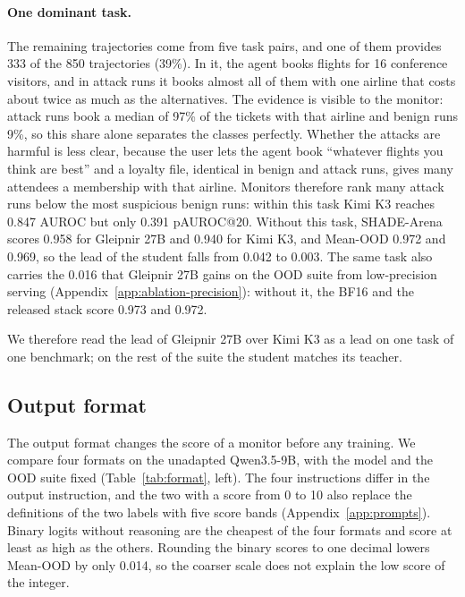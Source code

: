 \paragraph{One dominant task.}
The remaining trajectories come from five task pairs, and one of them provides 333 of the 850 trajectories (39\%).
In it, the agent books flights for 16 conference visitors, and in attack runs it books almost all of them with one airline that costs about twice as much as the alternatives.
The evidence is visible to the monitor: attack runs book a median of 97\% of the tickets with that airline and benign runs 9\%, so this share alone separates the classes perfectly.
Whether the attacks are harmful is less clear, because the user lets the agent book ``whatever flights you think are best'' and a loyalty file, identical in benign and attack runs, gives many attendees a membership with that airline.
Monitors therefore rank many attack runs below the most suspicious benign runs: within this task Kimi K3 reaches 0.847 AUROC but only 0.391 pAUROC@20.
Without this task, SHADE-Arena scores 0.958 for Gleipnir 27B and 0.940 for Kimi K3, and Mean-OOD 0.972 and 0.969, so the lead of the student falls from 0.042 to 0.003.
The same task also carries the 0.016 that Gleipnir 27B gains on the OOD suite from low-precision serving (Appendix~\ref{app:ablation-precision}): without it, the BF16 and the released stack score 0.973 and 0.972.

We therefore read the lead of Gleipnir 27B over Kimi K3 as a lead on one task of one benchmark; on the rest of the suite the student matches its teacher.

\subsection{Output format}
\label{app:ablation-format}

The output format changes the score of a monitor before any training.
We compare four formats on the unadapted Qwen3.5-9B, with the model and the OOD suite fixed (Table~\ref{tab:format}, left).
The four instructions differ in the output instruction, and the two with a score from 0 to 10 also replace the definitions of the two labels with five score bands (Appendix~\ref{app:prompts}).
Binary logits without reasoning are the cheapest of the four formats and score at least as high as the others.
Rounding the binary scores to one decimal lowers Mean-OOD by only 0.014, so the coarser scale does not explain the low score of the integer.

